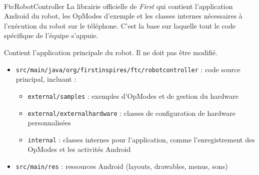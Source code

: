 \documentclass[12pt, a4paper]{report}
\newcommand{\registeredcompany}[1]{\textit{#1\textsuperscript{\tiny\textregistered}}}
\begin{document}
    \begin{mydefinition}{FtcRobotController}
        La librairie officielle de \registeredcompany{First} qui contient l’application Android du robot, les OpModes d’exemple et les classes internes nécessaires à l’exécution du robot sur le téléphone.
        C’est la base sur laquelle tout le code spécifique de l’équipe s’appuie.
    \end{mydefinition}

    Contient l’application principale du robot. Il ne doit pas être modifié.
    \begin{itemize}
        \item \texttt{src/main/java/org/firstinspires/ftc/robotcontroller} : code source principal, incluant :
        \begin{itemize}
            \item \texttt{external/samples} : exemples d’OpModes et de gestion du hardware
            \item \texttt{external/externalhardware} : classes de configuration de hardware personnalisées
            \item \texttt{internal} : classes internes pour l’application, comme l’enregistrement des OpModes et les activités Android
        \end{itemize}
        \item \texttt{src/main/res} : ressources Android (layouts, drawables, menus, sons)
    \end{itemize}
\end{document}
